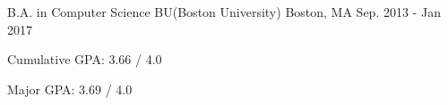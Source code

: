


\begin{cventries}


\cventry
{B.A. in Computer Science} %
{BU(Boston University)} %
{Boston, MA} %
{Sep. 2013 - Jan 2017} %
{ %
\begin{cvitems}
\item Cumulative GPA: 3.66 / 4.0
\item Major GPA: 3.69 / 4.0
\end{cvitems}
}


\end{cventries}
